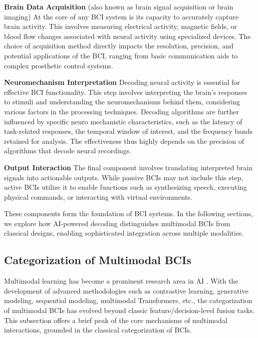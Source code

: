 \documentclass[journal]{IEEEtran}
\begin{document}
\textbf{Brain Data Acquisition} (also known as brain signal acquisition or brain imaging) At the core of any BCI system is its capacity to accurately capture brain activity. This involves measuring electrical activity, magnetic fields, or blood flow changes associated with neural activity using specialized devices. The choice of acquisition method directly impacts the resolution, precision, and potential applications of the BCI, ranging from basic communication aids to complex prosthetic control systems.

\textbf{Neuromechanism Interpretation} Decoding neural activity is essential for effective BCI functionality. This step involves interpreting the brain's responses to stimuli and understanding the neuromechanisms behind them, considering various factors in the processing techniques. Decoding algorithms are further influenced by specific neuro mechanistic characteristics, such as the latency of task-related responses, the temporal window of interest, and the frequency bands retained for analysis. The effectiveness thus highly depends on the precision of algorithms that decode neural recordings.

\textbf{Output Interaction} The final component involves translating interpreted brain signals into actionable outputs. While passive BCIs may not include this step, active BCIs utilize it to enable functions such as synthesizing speech, executing physical commands, or interacting with virtual environments.

These components form the foundation of BCI systems. In the following sections, we explore how AI-powered decoding distinguishes multimodal BCIs from classical designs, enabling sophisticated integration across multiple modalities.

\subsection{Categorization of Multimodal BCIs} \label{sect:perspective}

Multimodal learning has become a prominent research area in AI \cite{Baltrusaitis2019}. With the development of advanced methodologies such as contrastive learning, generative modeling, sequential modeling, multimodal Transformers, etc., the categorization of multimodal BCIs has evolved beyond classic feature/decision-level fusion tasks. This subsection offers a brief peak of the core mechanisms of multimodal interactions, grounded in the classical categorization of BCIs.
\end{document}
